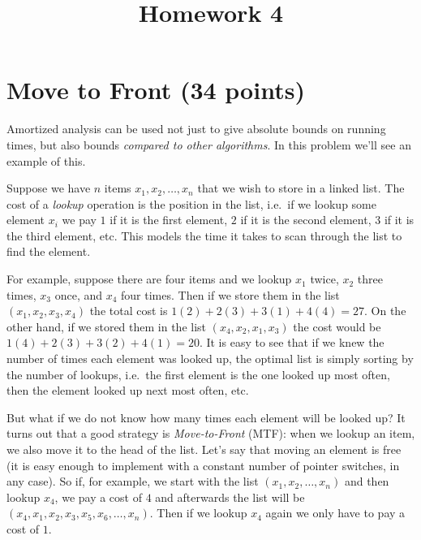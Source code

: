 \documentclass{article}
\begin{document}
\title{Homework 4}
\maketitle
\thispagestyle{fancy}


\section{Move to Front (34 points)}
Amortized analysis can be used not just to give absolute bounds on running times, but also bounds \emph{compared to other algorithms}.  In this problem we'll see an example of this.

Suppose we have $n$ items $x_1, x_2, \dots, x_n$ that we wish to store in a linked list.  The cost of a \emph{lookup} operation is the position in the list, i.e.~if we lookup some element $x_i$ we pay $1$ if it is the first element, $2$ if it is the second element, $3$ if it is the third element, etc.  This models the time it takes to scan through the list to find the element.  

For example, suppose there are four items and we lookup $x_1$ twice, $x_2$ three times, $x_3$ once, and $x_4$ four times.  Then if we store them in the list $(x_1, x_2, x_3, x_4)$ the total cost is $1(2) + 2(3) + 3(1) + 4(4) = 27$.  On the other hand, if we stored them in the list $(x_4, x_2, x_1, x_3)$ the cost would be $1(4) + 2(3) + 3(2) + 4(1) = 20$.  It is easy to see that if we knew the number of times each element was looked up, the optimal list is simply sorting by the number of lookups, i.e.~the first element is the one looked up most often, then the element looked up next most often, etc.  

But what if we do not know how many times each element will be looked up?  It turns out that a good strategy is \emph{Move-to-Front} (MTF): when we lookup an item, we also move it to the head of the list.  Let's say that moving an element is free (it is easy enough to implement with a constant number of pointer switches, in any case).  So if, for example, we start with the list $(x_1, x_2, \dots, x_n)$ and then lookup $x_4$, we pay a cost of $4$ and afterwards the list will be $(x_4, x_1, x_2, x_3, x_5, x_6, \dots, x_n)$.  Then if we lookup $x_4$ again we only have to pay a cost of $1$.  
\end{document}
